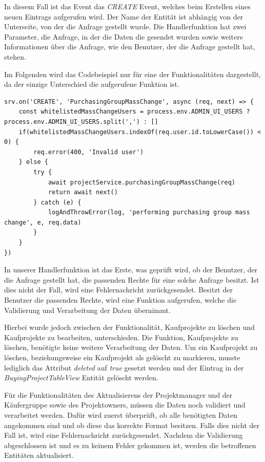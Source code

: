 In diesem Fall ist das Event das \textit{CREATE} Event, welches beim Erstellen eines neuen Eintrags aufgerufen wird.
Der Name der Entität ist abhängig von der Unterseite, von der die Anfrage gestellt wurde.
Die Handlerfunktion hat zwei Parameter, die Anfrage, in der die Daten die gesendet wurden sowie weitere Informationen über die Anfrage, wie den Benutzer, der die Anfrage gestellt hat, stehen.

Im Folgenden wird das Codebeispiel nur für eine der Funktionalitäten dargestellt, da der einzige Unterschied die aufgerufene Funktion ist.
\begin{lstlisting}[caption={srv.on Funktion zum Abfangen der Anfrage}]    
srv.on('CREATE', 'PurchasingGroupMassChange', async (req, next) => {
    const whitelistedMassChangeUsers = process.env.ADMIN_UI_USERS ? process.env.ADMIN_UI_USERS.split(',') : []
    if(whitelistedMassChangeUsers.indexOf(req.user.id.toLowerCase()) < 0) {
        req.error(400, 'Invalid user')
    } else {
        try {
            await projectService.purchasingGroupMassChange(req)
            return await next()
        } catch (e) {
            logAndThrowError(log, 'performing purchasing group mass change', e, req.data)
        }
    }
})
\end{lstlisting}

In unserer Handlerfunktion ist das Erste, was geprüft wird, ob der Benutzer, der die Anfrage gestellt hat, die passenden Rechte für eine solche Anfrage besitzt.
Ist dies nicht der Fall, wird eine Fehlernachricht zurückgesendet.
Besitzt der Benutzer die passenden Rechte, wird eine Funktion aufgerufen, welche die Validierung und Verarbeitung der Daten übernimmt.

Hierbei wurde jedoch zwischen der Funktionalität, Kaufprojekte zu löschen und Kaufprojekte zu bearbeiten, unterschieden.
Die Funktion, Kaufprojekte zu löschen, benötigte keine weitere Verarbeitung der Daten.
Um ein Kaufprojekt zu löschen, beziehungsweise ein Kaufprojekt als gelöscht zu markieren, musste lediglich das Attribut \textit{deleted} auf \textit{true} gesetzt werden und der Eintrag in der \textit{BuyingProjectTableView} Entität gelöscht werden.

Für die Funktionalitäten des Aktualisierens der Projektmanager und der Käufergruppe sowie des Projektowners, müssen die Daten noch validiert und verarbeitet werden. 
Dafür wird zuerst überprüft, ob alle benötigten Daten angekommen sind und ob diese das korrekte Format besitzen.
Falls dies nicht der Fall ist, wird eine Fehlernachricht zurückgesendet.
Nachdem die Validierung abgeschlossen ist und es zu keinem Fehler gekommen ist, werden die betroffenen Entitäten aktualisiert. 

